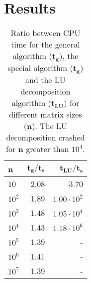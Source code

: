 \section{Results}
\label{sec:results}


\begin{table}[htbp]
	\centering
	\begin{tabular}{lrr}
		\textbf{n} & $\mathbf{{t_g}/{t_s}}$ & $\mathbf{{t_{LU}}/{t_s}}$  \\
		\midrule
		\addlinespace[0.1cm]

		10         & 2.08                                                                                          & 3.70                                                                                        \\
		$10^2$       & 1.89                                                                                          & $1.00\cdot 10^2 $                                                                                         \\
		$10^3$       & 1.48                                                                                          & $1.05 \cdot 10^4 $                                                                                        \\
		$10^4$       & 1.43                                                                                          & $1.18 \cdot 10^6$                                                                                         \\
		$10^5$       & 1.39                                                                                          & -                                                                                         \\
		$10^6$       & 1.41                                                                                          & -                                                                                        \\
		$10^7$       & 1.39                                                                                          &    -
	\end{tabular}  \caption{Ratio between CPU time for the general algorithm ($\mathbf{t_g}$), the special algorithm ($\mathbf{t_g}$) and the LU decomposition algorithm ($\mathbf{t_{LU}}$) for different matrix sizes (\textbf{n}). The LU decomposition crashed for \textbf{n} greater than $10^4$.} \label{table:time}
\end{table}

